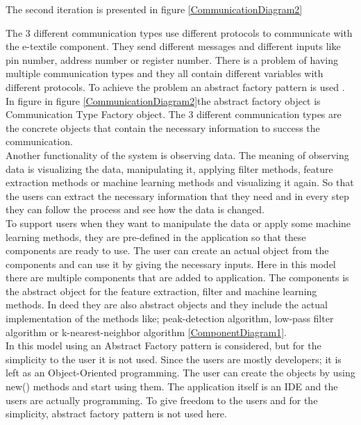 	The second iteration is presented in figure \ref{CommunicationDiagram2} \\


The 3 different communication types use different protocols to communicate with the e-textile component. They send different messages and different inputs like pin number, address number or register number. There is a problem of having multiple communication types and they all contain different variables with different protocols. To achieve the problem an abstract factory pattern is used \cite{GoF}. In figure in figure \ref{CommunicationDiagram2}the abstract factory object is Communication Type Factory object. The 3 different communication types are the concrete objects that contain the necessary information to success the communication. \\

Another functionality of the system is observing data. The meaning of observing data is visualizing the data, manipulating it, applying filter methods, feature extraction methods or machine learning methods and visualizing it again. So that the users can extract the necessary information that they need and in every step they can follow the process and see how the data is changed. \\

To support users when they want to manipulate the data or apply some machine learning methods, they are pre-defined in the application so that these components are ready to use. The user can create an actual object from the components and can use it by giving the necessary inputs. Here in this model there are multiple components that are added to application. The components is the abstract object for the feature extraction, filter and machine learning methods. In deed they are also abstract objects and they include the actual implementation of the methods like; peak-detection algorithm, low-pass filter algorithm or k-nearest-neighbor algorithm \ref{ComponentDiagram1}. \\

In this model using an Abstract Factory pattern is considered, but for the simplicity to the user it is not used. Since the users are mostly developers; it is left as an Object-Oriented programming. The user can create the objects by using new() methods and start using them. The application itself is an IDE and the users are actually programming. To give freedom to the users and for the simplicity, abstract factory pattern is not used here. \\

